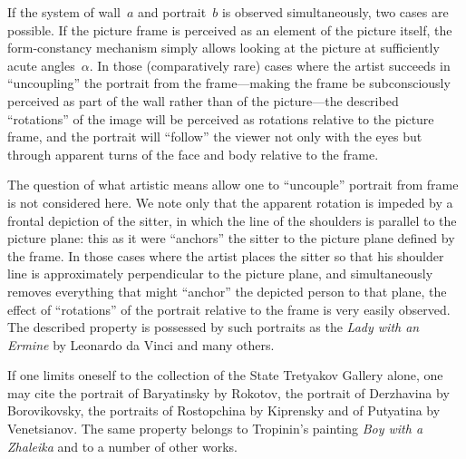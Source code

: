 If the system of wall~$a$ and portrait~$b$ is observed simultaneously, two cases are
possible.  If the picture frame is perceived as an element of the picture itself, the
form-constancy mechanism simply allows looking at the picture at sufficiently acute
angles~$\alpha$.  In those (comparatively rare) cases where the artist succeeds in
``uncoupling'' the portrait from the frame---making the frame be subconsciously perceived
as part of the wall rather than of the picture---the described ``rotations'' of the image
will be perceived as rotations relative to the picture frame, and the portrait will
``follow'' the viewer not only with the eyes but through apparent turns of the face and
body relative to the frame.

The question of what artistic means allow one to ``uncouple'' portrait from frame is not
considered here.  We note only that the apparent rotation is impeded by a frontal
depiction of the sitter, in which the line of the shoulders is parallel to the picture
plane: this as it were ``anchors'' the sitter to the picture plane defined by the frame.
In those cases where the artist places the sitter so that his shoulder line is
approximately perpendicular to the picture plane, and simultaneously removes everything
that might ``anchor'' the depicted person to that plane, the effect of ``rotations'' of
the portrait relative to the frame is very easily observed.  The described property is
possessed by such portraits as the \emph{Lady with an Ermine} by Leonardo da Vinci and
many others.

If one limits oneself to the collection of the State Tretyakov Gallery alone, one may
cite the portrait of Baryatinsky by Rokotov, the portrait of Derzhavina by Borovikovsky,
the portraits of Rostopchina by Kiprensky and of Putyatina by Venetsianov.  The same
property belongs to Tropinin's painting \emph{Boy with a Zhaleika} and to a number of
other works.
